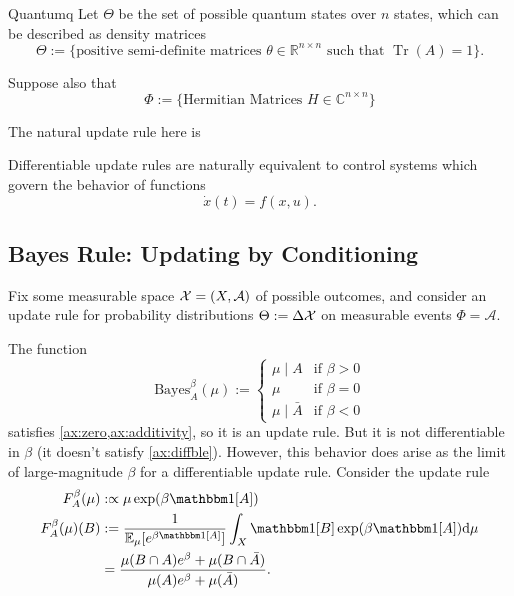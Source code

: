 \documentclass{article}
\DeclareMathOperator{\Tr}{Tr}
\begin{document}
\begin{examplex}{Quantum}{q}
    Let
    $\Theta$ be the set of possible quantum states over $n$ states, which 
    can be described as density matrices
    \[ 
        \Theta := \Big\{ \text{positive semi-definite matrices } \theta \in \mathbb R^{n \times n} \text{ such that } \Tr(A) = 1 \Big\}.
    \]

    Suppose also that 
    \[
        \Phi := \Big\{ \text{Hermitian Matrices } H \in \mathbb C^{n \times n} \Big\}
    \]

    The natural update rule here is 
\end{examplex}


\begin{prop}
    Differentiable update rules are naturally equivalent to control systems
    which govern the behavior of functions
    \[
        \dot x(t) = f(x, u).
    \]
\end{prop}

\subsection{Bayes Rule: Updating by Conditioning}
Fix some measurable space $\mathcal X = (X, \mathcal A)$ of possible outcomes, and consider an update rule for probability distributions $\Theta := \Delta\mathcal X$
on measurable events $\Phi = \mathcal A$.

The function
\[
    \mathrm{Bayes}^\beta_A(\mu) := \begin{cases}
            \mu \mid A &  \text{if }\beta > 0 \\
            \mu & \text{if } \beta = 0 \\
            \mu \mid \bar A &  \text{if } \beta < 0
        \end{cases}
\]
satisfies \cref{ax:zero,ax:additivity}, so it is an update rule.  But it is not differentiable in $\beta$ (it doesn't satisfy \cref{ax:diffble}).
However, this behavior does arise as the limit of large-magnitude $\beta$ for a differentiable update rule. Consider the update rule
\begin{align*}
    F^\beta_A (\mu) &:\propto \mu \exp(\beta \mathbbm1[A]) \\
    F^\beta_A (\mu)(B) &:=
        \frac{1}{\Ex_{\mu}[e^{\beta\mathbbm1[A]}]}\int_{X}  \mathbbm1[B] \exp(\beta \mathbbm1[A]) \mathrm d\mu \\
        &=
        \frac{\mu(B\cap A)e^{\beta} + \mu(B \cap \bar A) }
        {\mu(A)e^{\beta} + \mu(\bar A)}.
\end{align*}
\end{document}
